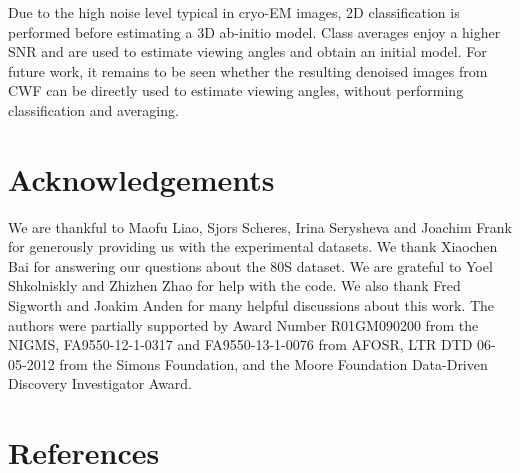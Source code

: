 \documentclass[review]{elsarticle}
\begin{document}
Due to the high noise level typical in cryo-EM images, 2D classification is performed before estimating a 3D ab-initio model. Class averages 
enjoy a higher SNR and are used to estimate viewing angles and obtain an initial model.
For future work, it remains to be seen whether the resulting denoised images from CWF can be directly used to estimate viewing angles,
without performing classification and averaging.


\section{Acknowledgements}
We are thankful to Maofu Liao, Sjors Scheres, Irina Serysheva and Joachim Frank for generously
providing us with the experimental datasets. We thank Xiaochen Bai for answering our questions about the 80S dataset.
We are grateful to Yoel Shkolniskly and Zhizhen Zhao for help with the code. We also thank Fred Sigworth and Joakim Anden for many
helpful discussions about this work. The authors were partially supported by Award Number R01GM090200 from the NIGMS,
FA9550-12-1-0317 and FA9550-13-1-0076 from AFOSR, LTR DTD 06-05-2012 from the Simons
Foundation, and the Moore Foundation Data-Driven Discovery Investigator Award.

\clearpage
\section*{References}


\end{document}
